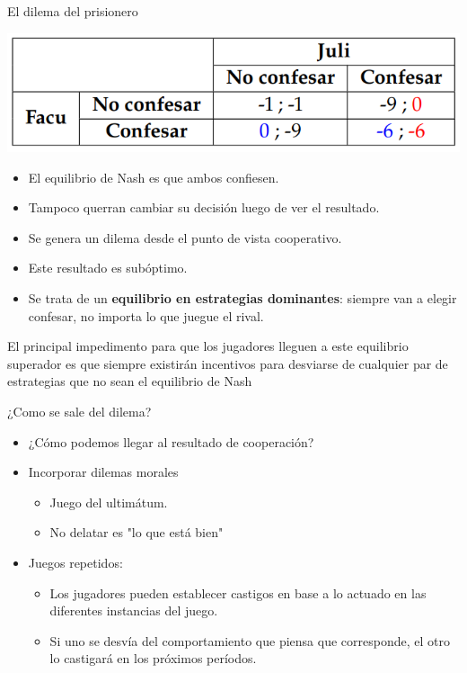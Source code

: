 \documentclass{beamer}
\begin{document}
\begin{frame}{El dilema del prisionero}
    \begin{center}
        \includegraphics[scale=0.6]{../Figures/T20.9.png}
    \end{center}
    \begin{itemize}
        \item El equilibrio de Nash es que ambos confiesen.
        \item Tampoco querran cambiar su decisión luego de ver el resultado.
        \item Se genera un dilema desde el punto de vista cooperativo.
        \item Este resultado es subóptimo.
        \item Se trata de un \textbf{equilibrio en estrategias dominantes}: siempre van a elegir confesar, no importa lo que juegue el rival.
    \end{itemize}
    \begin{boxA}
        \centering
        El principal impedimento para que los jugadores lleguen a este equilibrio superador es que siempre existirán incentivos para desviarse de cualquier par de estrategias que no sean el equilibrio de Nash
    \end{boxA}
\end{frame}

\begin{frame}{¿Como se sale del dilema?}
    \begin{itemize}
        \item ¿Cómo podemos llegar al resultado de cooperación?
        \item Incorporar dilemas morales
        \begin{itemize}
            \item Juego del ultimátum.
            \item No delatar es "lo que está bien"
        \end{itemize}
        \item Juegos repetidos:
        \begin{itemize}
            \item Los jugadores pueden establecer castigos en base a lo actuado en las diferentes instancias del juego.
            \item  Si uno se desvía del comportamiento que piensa que corresponde, el otro lo castigará en los próximos períodos.
        \end{itemize}
    \end{itemize}
\end{frame}
\end{document}
